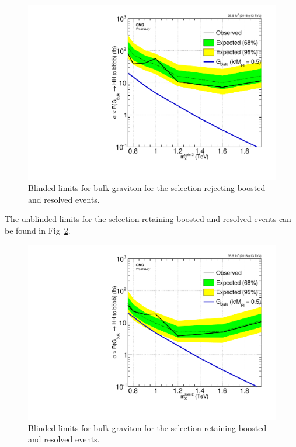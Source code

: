 \begin{figure}[thb!]
\begin{center}
\includegraphics[scale=0.5]{F5/brazilianFlag_2p1BGboostres_HH4b2p1_HH4b2p1_13TeV.pdf}
\end{center}
\caption{Blinded limits for bulk graviton for the selection rejecting boosted and resolved events.}
\label{fig:BGblindboth}
\end{figure} 

The unblinded limits for the selection retaining boosted and resolved events can be found in Fig~\ref{fig:BGblindnone}.

\begin{figure}[thb!]
\begin{center}
\includegraphics[scale=0.5]{F5/brazilianFlag_2p1BGretain_HH4b2p1_HH4b2p1_13TeV.pdf}
\end{center}
\caption{Blinded limits for bulk graviton for the selection retaining boosted and resolved events.}
\label{fig:BGblindnone}
\end{figure} 

